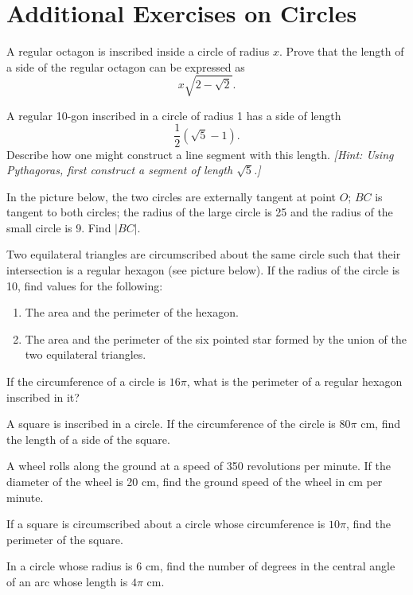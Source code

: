 \documentclass[12pt]{book} %
\begin{document}
\section*{Additional Exercises on Circles}

\setcounter{Exercise}{0}
\begin{ExerciseList}
\Exercise A regular octagon is inscribed inside a circle of radius $x$. Prove that the length of a side of the regular octagon can be expressed as
\[
x\sqrt{2-\sqrt{2}}.
\]

\Exercise A regular 10-gon inscribed in a circle of radius 1 has a side of length
\[
\frac12(\sqrt{5}-1).
\]
Describe how one might construct a line segment with this length. \textit{[Hint: Using Pythagoras, first construct a segment of length $\sqrt{5}$.]}

\Exercise In the picture below, the two circles are externally tangent at point $O$; $BC$ is tangent to both circles; the radius of the large circle is 25 and the radius of the small circle is 9. Find $|BC|$.


\Exercise Two equilateral triangles are circumscribed about the same circle such that their intersection is a regular hexagon (see picture below). If the radius of the circle is 10, find values for the following:
\begin{enumerate}
\item[(a)] The area and the perimeter of the hexagon.
\item[(b)] The area and the perimeter of the six pointed star formed by the union of the two equilateral triangles.
\end{enumerate}


\Exercise If the circumference of a circle is $16\pi$, what is the perimeter of a regular hexagon inscribed in it?

\Exercise A square is inscribed in a circle. If the circumference of the circle is $80\pi$ cm, find the length of a side of the square.

\Exercise A wheel rolls along the ground at a speed of 350 revolutions per minute. If the diameter of the wheel is 20 cm, find the ground speed of the wheel in cm per minute.

\Exercise If a square is circumscribed about a circle whose circumference is $10\pi$, find the perimeter of the square.

\Exercise In a circle whose radius is 6 cm, find the number of degrees in the central angle of an arc whose length is $4\pi$ cm.


\end{ExerciseList}
\end{document}
